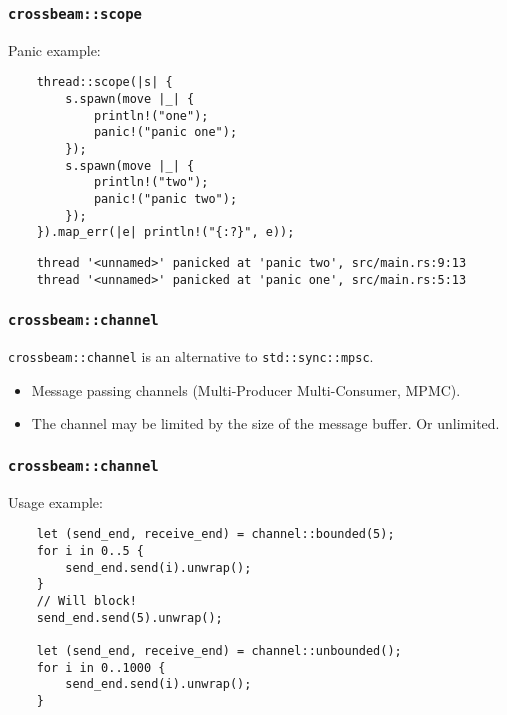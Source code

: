 \documentclass[aspectratio=1610,t]{beamer}
\begin{document}

\begin{frame}[fragile]
\frametitle{\texttt{crossbeam::scope}}
Panic example:

\begin{verbatim}
    thread::scope(|s| {
        s.spawn(move |_| {
            println!("one");
            panic!("panic one");
        });
        s.spawn(move |_| {
            println!("two");
            panic!("panic two");
        });
    }).map_err(|e| println!("{:?}", e));
\end{verbatim}

\begin{verbatim}
    thread '<unnamed>' panicked at 'panic two', src/main.rs:9:13
    thread '<unnamed>' panicked at 'panic one', src/main.rs:5:13
\end{verbatim}
\end{frame}


\begin{frame}[fragile]
\frametitle{\texttt{crossbeam::channel}}
\texttt{crossbeam::channel} is an alternative to \texttt{std::sync::mpsc}.

\begin{itemize}
    \item Message passing channels (Multi-Producer Multi-Consumer, MPMC).
    \item The channel may be limited by the size of the message buffer. Or unlimited.
\end{itemize}
\end{frame}


\begin{frame}[fragile]
\frametitle{\texttt{crossbeam::channel}}
Usage example:

\begin{verbatim}
    let (send_end, receive_end) = channel::bounded(5);
    for i in 0..5 {
        send_end.send(i).unwrap();
    }
    // Will block!
    send_end.send(5).unwrap();

    let (send_end, receive_end) = channel::unbounded();
    for i in 0..1000 {
        send_end.send(i).unwrap();
    }
\end{verbatim}
\end{frame}
\end{document}

